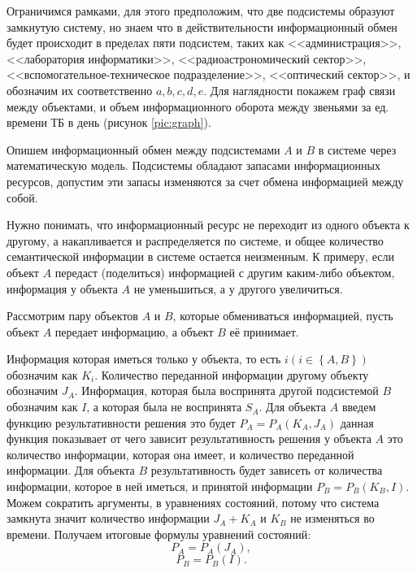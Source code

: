 Ограничимся рамками, для этого предположим, что две подсистемы образуют замкнутую систему, но знаем что в действительности информационный обмен будет происходит в пределах пяти подсистем, таких как <<администрация>>, <<лаборатория информатики>>, <<радиоастрономический сектор>>, <<вспомогательное-техническое подразделение>>, <<оптический сектор>>, и обозначим их соответственно $a, b, c, d, e$. Для наглядности покажем граф связи между объектами, и объем информационного оборота между звеньями за ед. времени ТБ в день (рисунок \ref{pic:graph}).


  
Опишем информационный обмен между подсистемами $A$ и $B$ в системе через математическую модель.
Подсистемы обладают запасами информационных ресурсов, допустим эти запасы изменяются за счет обмена информацией между собой. 


Нужно понимать, что информационный ресурс не переходит из одного объекта к другому, а накапливается и распределяется по системе, и общее количество семантической информации в системе остается неизменным. К примеру, если объект $A$ передаст (поделиться) информацией с другим каким-либо объектом, информация у объекта $A$ не уменьшиться, а у другого увеличиться.

Рассмотрим пару объектов $A$ и $B$, которые обмениваться информацией, пусть объект $A$ передает информацию, а объект $B$ её принимает.

Информация которая иметься только у объекта, то есть  $i \left( i \in \left\{A,B \right\} \right)$ обозначим как $K_i$. Количество переданной информации другому объекту обозначим $J_A$. Информация, которая была воспринята другой подсистемой $B$ обозначим как $I$, а которая была не воспринята $S_A$. Для объекта $A$ введем функцию результативности решения это будет $P_A=P_A(K_A,J_A)$ данная функция показывает от чего зависит результативность решения у объекта $A$ 	это количество информации, которая она имеет, и количество переданной информации. Для объекта $B$ результативность будет зависеть от количества информации, которое в ней иметься, и принятой информации $P_B=P_B(K_B,I)$. 
Можем сократить аргументы, в уравнениях состояний, потому что система замкнута значит количество информации $J_A+K_A$ и $K_B$ не изменяться во времени. Получаем итоговые формулы уравнений состояний:
\begin{equation}\label{eq:sost1}
P_A=P_A(J_A),
\end{equation}
\begin{equation}\label{eq:sost2}
P_B=P_B(I). 
\end{equation}

